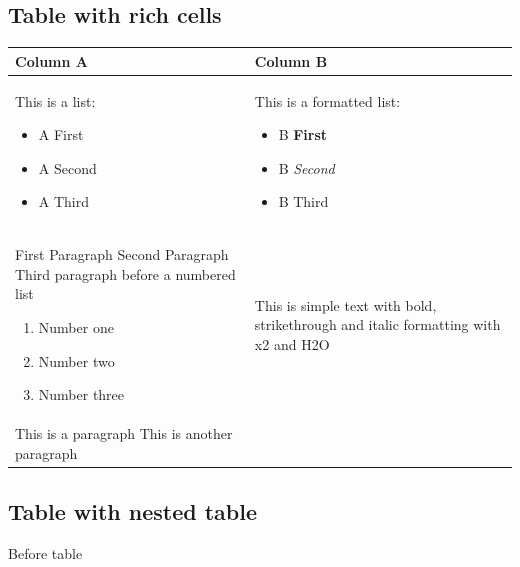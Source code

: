 \documentclass[11pt,a4paper]{article}
\begin{document}
\subsection{Table with rich cells}

\begin{table}[h]
\begin{tabular}{|l|l|}
\hline
 Column A & Column B \\ \hline
This is a list:  \begin{itemize} \item A First \item A Second \item A Third \end{itemize} & This is a formatted list:  \begin{itemize} \item B  \textbf{First} \item B  \textit{Second} \item B  Third \end{itemize} \\ \hline
First Paragraph  Second Paragraph  Third paragraph before a numbered list  \begin{enumerate} \item Number one \item Number two \item Number three \end{enumerate} & This is simple text with bold, strikethrough and italic formatting with x2 and H2O \\ \hline
This is a paragraph  This is another paragraph &  \\ \hline
\end{tabular}
\end{table}

\subsection{Table with nested table}

Before table
\end{document}
